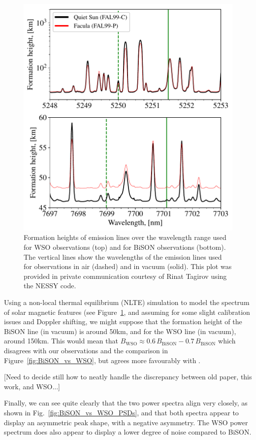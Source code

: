 \begin{figure}[ht!]
	\centering
	\includegraphics[width=0.85\columnwidth]{fheight_high_res.eps}
	\caption{Formation heights of emission lines over the wavelength range used for WSO observations (top) and for BiSON observations (bottom). The vertical lines show the wavelengths of the emission lines used for observations in air (dashed) and in vacuum (solid). This plot was provided in private communication courtesy of Rinat Tagirov using the NESSY code.}
	\label{fig:formation_height}
\end{figure}

Using a non-local thermal equilibrium (NLTE) simulation to model the spectrum of solar magnetic features (see Figure~\ref{fig:formation_height}, and assuming for some slight calibration issues and Doppler shifting, we might suppose that the formation height of the BiSON line (in vacuum) is around 50km, and for the WSO line (in vacuum), around 150km. This would mean that $B_\mathrm{WSO} \approx 0.6\, B_\mathrm{BiSON} - 0.7 \, B_\mathrm{BiSON}$ which disagrees with our observations and the comparison in Figure~\ref{fig:BiSON_vs_WSO}, but agrees more favourably with \citet{chaplin_studies_2003}.

[Need to decide still how to neatly handle the discrepancy between old paper, this work, and WSO...]


Finally, we can see quite clearly that the two power spectra align very closely, as shown in Fig.~\ref{fig:BiSON_vs_WSO_PSDs}, and that both spectra appear to display an asymmetric peak shape, with a negative asymmetry. The WSO power spectrum does also appear to display a lower degree of noise compared to BiSON.






